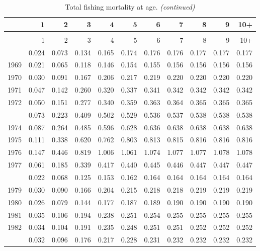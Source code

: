 \documentclass[
]{article}
\begin{document}
\begin{longtable}[t]{lrrrrrrrrrr}
\caption{\label{tab:FAA-tot-table}Total fishing mortality at age.}\\
\toprule
  & 1 & 2 & 3 & 4 & 5 & 6 & 7 & 8 & 9 & 10+\\
\midrule
\endfirsthead
\caption[]{Total fishing mortality at age. \textit{(continued)}}\\
\toprule
  & 1 & 2 & 3 & 4 & 5 & 6 & 7 & 8 & 9 & 10+\\
\midrule
\endhead

\endfoot
\bottomrule
\endlastfoot
1968 & 0.024 & 0.073 & 0.134 & 0.165 & 0.174 & 0.176 & 0.176 & 0.177 & 0.177 & 0.177\\
1969 & 0.021 & 0.065 & 0.118 & 0.146 & 0.154 & 0.155 & 0.156 & 0.156 & 0.156 & 0.156\\
1970 & 0.030 & 0.091 & 0.167 & 0.206 & 0.217 & 0.219 & 0.220 & 0.220 & 0.220 & 0.220\\
1971 & 0.047 & 0.142 & 0.260 & 0.320 & 0.337 & 0.341 & 0.342 & 0.342 & 0.342 & 0.342\\
1972 & 0.050 & 0.151 & 0.277 & 0.340 & 0.359 & 0.363 & 0.364 & 0.365 & 0.365 & 0.365\\
\addlinespace
1973 & 0.073 & 0.223 & 0.409 & 0.502 & 0.529 & 0.536 & 0.537 & 0.538 & 0.538 & 0.538\\
1974 & 0.087 & 0.264 & 0.485 & 0.596 & 0.628 & 0.636 & 0.638 & 0.638 & 0.638 & 0.638\\
1975 & 0.111 & 0.338 & 0.620 & 0.762 & 0.803 & 0.813 & 0.815 & 0.816 & 0.816 & 0.816\\
1976 & 0.147 & 0.446 & 0.819 & 1.006 & 1.061 & 1.074 & 1.077 & 1.077 & 1.078 & 1.078\\
1977 & 0.061 & 0.185 & 0.339 & 0.417 & 0.440 & 0.445 & 0.446 & 0.447 & 0.447 & 0.447\\
\addlinespace
1978 & 0.022 & 0.068 & 0.125 & 0.153 & 0.162 & 0.164 & 0.164 & 0.164 & 0.164 & 0.164\\
1979 & 0.030 & 0.090 & 0.166 & 0.204 & 0.215 & 0.218 & 0.218 & 0.219 & 0.219 & 0.219\\
1980 & 0.026 & 0.079 & 0.144 & 0.177 & 0.187 & 0.189 & 0.190 & 0.190 & 0.190 & 0.190\\
1981 & 0.035 & 0.106 & 0.194 & 0.238 & 0.251 & 0.254 & 0.255 & 0.255 & 0.255 & 0.255\\
1982 & 0.034 & 0.104 & 0.191 & 0.235 & 0.248 & 0.251 & 0.251 & 0.252 & 0.252 & 0.252\\
\addlinespace
1983 & 0.032 & 0.096 & 0.176 & 0.217 & 0.228 & 0.231 & 0.232 & 0.232 & 0.232 & 0.232\\

\end{longtable}
\end{document}
